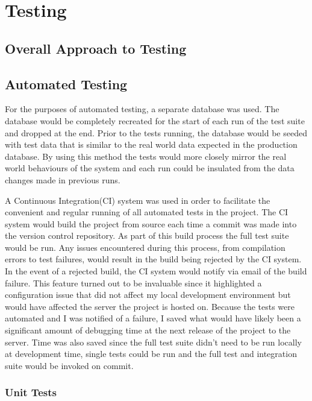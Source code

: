 \chapter{Testing}

\section{Overall Approach to Testing}



\section{Automated Testing}

For the purposes of automated testing, a separate database was used. The database would be completely recreated for the start of each run of the test suite and dropped at the end. Prior to the tests running, the database would be seeded with test data that is similar to the real world data expected in the production database. By using this method the tests would more closely mirror the real world behaviours of the system and each run could be insulated from the data changes made in previous runs.

A Continuous Integration(CI) system was used in order to facilitate the convenient and regular running of all automated tests in the project. The CI system would build the project from source each time a commit was made into the version control repository. As part of this build process the full test suite would be run. Any issues encountered during this process, from compilation errors to test failures, would result in the build being rejected by the CI system. In the event of a rejected build, the CI system would notify via email of the build failure. This feature turned out to be invaluable since it highlighted a configuration issue that did not affect my local development environment but would have affected the server the project is hosted on. Because the tests were automated and I was notified of a failure, I saved what would have likely been a significant amount of debugging time at the next release of the project to the server. Time was also saved since the full test suite didn't need to be run locally at development time, single tests could be run and the full test and integration suite would be invoked on commit. 

\subsection{Unit Tests}




